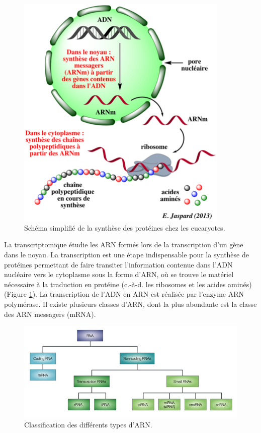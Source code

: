 \documentclass[11pt,a4paper,notrimn]{krantz}
\theoremstyle{definition}
\theoremstyle{definition}
\theoremstyle{remark}
\begin{document}
\begin{figure}[!htb]

{\centering \includegraphics[width=4in]{FiguresTables/2LocalGlobale} 

}

\caption{Schéma simplifié de la synthèse des protéines chez
les eucaryotes.}\label{fig:LocalGlobale}
\end{figure}

La transcriptomique étudie les ARN formés lors de la transcription d'un
gène dans le noyau. La transcription est une étape indispensable pour la
synthèse de protéines permettant de faire transiter l'information
contenue dans l'ADN nucléaire vers le cytoplasme sous la forme d'ARN, où
se trouve le matériel nécessaire à la traduction en protéine (c.-à-d.
les ribosomes et les acides aminés) (Figure \ref{fig:LocalGlobale}). La
transcription de l'ADN en ARN est réalisée par l'enzyme ARN polymérase.
Il existe plusieurs classes d'ARN, dont la plus abondante est la classe
des ARN messagers (mRNA).



\begin{figure}[!htb]

{\centering \includegraphics[width=6in]{FiguresTables/RNAtype} 

}

\caption{Classification des différents types d'ARN.}\label{fig:RNAtype}
\end{figure}
\end{document}
